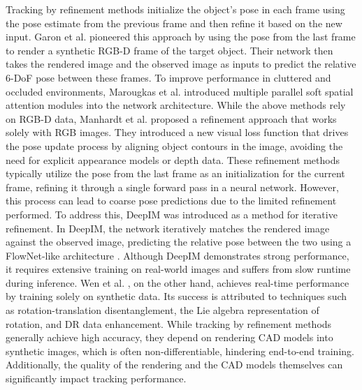 Tracking by refinement methods initialize the object's pose in each frame using the pose estimate from the previous frame and then refine it based on the new input. Garon et al. \cite{garon2017deep} pioneered this approach by using the pose from the last frame to render a synthetic RGB-D frame of the target object. Their network then takes the rendered image and the observed image as inputs to predict the relative 6-DoF pose between these frames. To improve performance in cluttered and occluded environments, Marougkas et al. \cite{marougkas2020track} introduced multiple parallel soft spatial attention modules into the network architecture. While the above methods rely on RGB-D data, Manhardt et al. \cite{manhardt2018deep} proposed a refinement approach that works solely with RGB images. They introduced a new visual loss function that drives the pose update process by aligning object contours in the image, avoiding the need for explicit appearance models or depth data. These refinement methods typically utilize the pose from the last frame as an initialization for the current frame, refining it through a single forward pass in a neural network. However, this process can lead to coarse pose predictions due to the limited refinement performed. To address this, DeepIM \cite{li2018deepim} was introduced as a method for iterative refinement. In DeepIM, the network iteratively matches the rendered image against the observed image, predicting the relative pose between the two using a FlowNet-like architecture \cite{dosovitskiy2015flownet}. Although DeepIM demonstrates strong performance, it requires extensive training on real-world images and suffers from slow runtime during inference. Wen et al. \cite{wen2020se}, on the other hand, achieves real-time performance by training solely on synthetic data. Its success is attributed to techniques such as rotation-translation disentanglement, the Lie algebra representation of rotation, and DR data enhancement. While tracking by refinement methods generally achieve high accuracy, they depend on rendering CAD models into synthetic images, which is often non-differentiable, hindering end-to-end training. Additionally, the quality of the rendering and the CAD models themselves can significantly impact tracking performance. 

